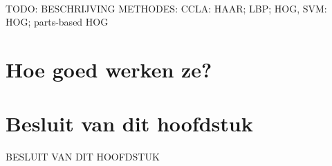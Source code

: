~\cite{viola2001rapid}

TODO: BESCHRIJVING METHODES: CCLA: HAAR; LBP; HOG, SVM: HOG; parts-based HOG %

%

\section{Hoe goed werken ze?}


\section{Besluit van dit hoofdstuk}
BESLUIT VAN DIT HOOFDSTUK %

